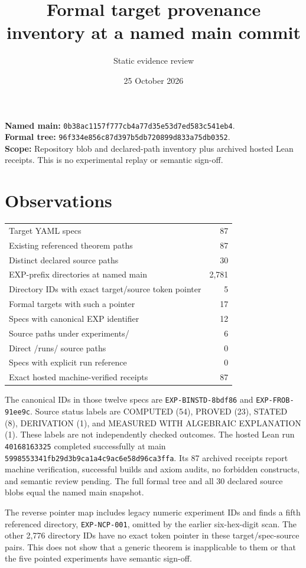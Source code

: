 \documentclass[11pt]{article}
\title{Formal target provenance inventory at a named main commit}
\author{Static evidence review}
\date{25 October 2026}
\begin{document}
\maketitle
\noindent\textbf{Named main:} \texttt{0b38ac1157f777cb4a77d35e53d7ed583c541eb4}.\\
\textbf{Formal tree:} \texttt{96f334e856c87d397b5db720899d833a75db0352}.\\
\textbf{Scope:} Repository blob and declared-path inventory plus archived hosted Lean receipts. This is no experimental replay or semantic sign-off.

\section*{Observations}
\begin{longtable}{lr}
Target YAML specs & 87\\
Existing referenced theorem paths & 87\\
Distinct declared source paths & 30\\
EXP-prefix directories at named main & 2,781\\
Directory IDs with exact target/source token pointer & 5\\
Formal targets with such a pointer & 17\\
Specs with canonical EXP identifier & 12\\
Source paths under experiments/ & 6\\
Direct /runs/ source paths & 0\\
Specs with explicit run reference & 0\\
Exact hosted machine-verified receipts & 87\\
\end{longtable}
The canonical IDs in those twelve specs are \texttt{EXP-BINSTD-8bdf86} and \texttt{EXP-FROB-91ee9c}. Source status labels are COMPUTED (54), PROVED (23), STATED (8), DERIVATION (1), and MEASURED WITH ALGEBRAIC EXPLANATION (1). These labels are not independently checked outcomes. The hosted Lean run \texttt{40168163325} completed successfully at main \texttt{5998553341fb29d3b9ca1a4c9ac6e58d96ca3ffa}. Its 87 archived receipts report machine verification, successful builds and axiom audits, no forbidden constructs, and semantic review pending. The full formal tree and all 30 declared source blobs equal the named main snapshot.

The reverse pointer map includes legacy numeric experiment IDs and finds a fifth referenced directory, \texttt{EXP-NCP-001}, omitted by the earlier six-hex-digit scan. The other 2,776 directory IDs have no exact token pointer in these target/spec-source pairs. This does not show that a generic theorem is inapplicable to them or that the five pointed experiments have semantic sign-off.
\end{document}
